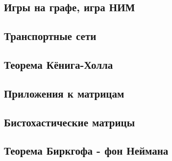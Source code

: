 \documentclass[a4paper, 12pt]{extarticle}
\begin{document}
\subsection{Игры на графе, игра НИМ}
\subsection{Транспортные сети}
\subsection{Теорема Кёнига-Холла}
\subsection{Приложения к матрицам}
\subsection{Бистохастические матрицы}
\subsection{Теорема Биркгофа - фон Неймана}
\end{document}
